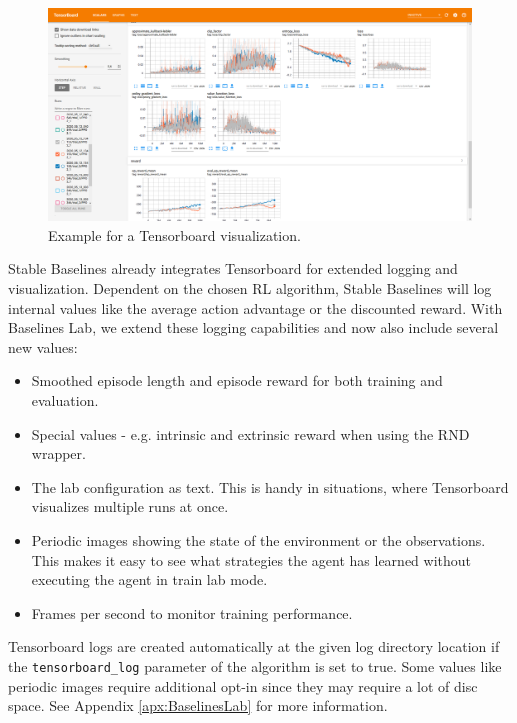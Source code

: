 \begin{figure}[ht]
    
    \begin{center}
        \includegraphics[clip, width=0.95\columnwidth]{figures/implementation/Tensorboard.png}
    \end{center}
    
    \caption[Tensorboard Example]{Example for a Tensorboard visualization.}
    \label{fig:TensorboardExample}
  \end{figure}

Stable Baselines already integrates Tensorboard for extended logging and visualization. Dependent on the chosen RL algorithm, Stable Baselines will log internal values like the average action advantage or the discounted reward. With Baselines Lab, we extend these logging capabilities and now also include several new values:

\begin{itemize}
    \item Smoothed episode length and episode reward for both training and evaluation.
    \item Special values - e.g. intrinsic and extrinsic reward when using the RND wrapper.
    \item The lab configuration as text. This is handy in situations, where Tensorboard visualizes multiple runs at once.
    \item Periodic images showing the state of the environment or the observations. This makes it easy to see what strategies the agent has learned without executing the agent in train lab mode.
    \item Frames per second to monitor training performance.
\end{itemize}

Tensorboard logs are created automatically at the given log directory location if the \texttt{tensorboard\_log} parameter of the algorithm is set to true. Some values like periodic images require additional opt-in since they may require a lot of disc space. See Appendix \ref{apx:BaselinesLab} for more information.

